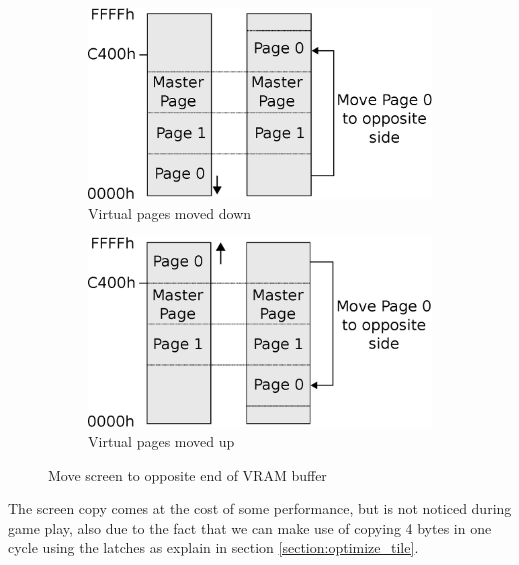 \documentclass[book.tex]{subfiles}
\begin{document}
\par
\begin{figure}[H]
\centering
\begin{subfigure}{.5\textwidth}
  \centering
  \includegraphics[width=.9\textwidth]{imgs/drawings/Page_down_switch.eps}
  \caption{Virtual pages moved down}
  \label{fig:page0_down}
\end{subfigure}%
\begin{subfigure}{.5\textwidth}
  \centering
  \includegraphics[width=.9\textwidth]{imgs/drawings/Page_up_switch.eps}
    \caption{Virtual pages moved up}
  \label{fig:page0_up}
\end{subfigure}
\caption{Move screen to opposite end of VRAM buffer}
\label{fig:page_wrapping}
\end{figure}
\par
The screen copy comes at the cost of some performance, but is not noticed during game play, also due to the fact that we can make use of copying 4 bytes in one cycle using the latches as explain in section \ref{section:optimize_tile}.\\
\par
\begin{minipage}{\textwidth}
  
  \end{minipage}
  \label{ega_refresh}
  \par
\end{document}
